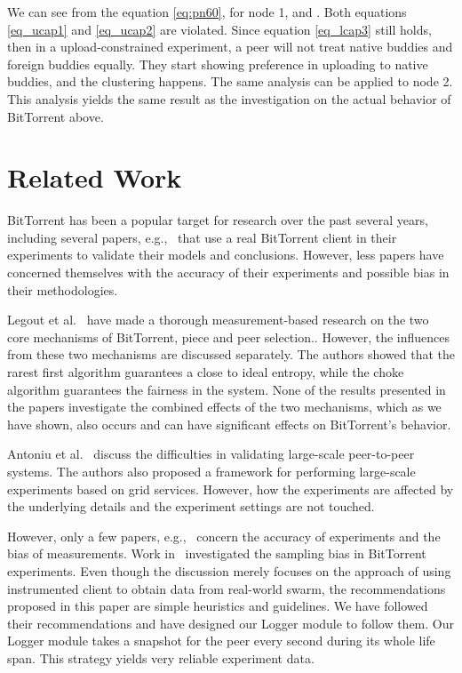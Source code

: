 \documentclass[10pt,letterpaper,twocolumn]{article}
\begin{document}
We can see from the equation \eqref{eq:pn60}, for node 1,
 and
. Both equations \eqref{eq_ucap1} and
\eqref{eq_ucap2} are violated. Since equation \eqref{eq_lcap3} still
holds, then in a upload-constrained experiment, a peer will not treat
native buddies and foreign buddies equally. They start showing
preference in uploading to native buddies, and the clustering
happens. The same analysis can be applied to node 2. This analysis
yields the same result as the investigation on the actual behavior of
BitTorrent above.













\section{Related Work}
\label{related_work}

BitTorrent has been a popular target for research over the past
several years, including several papers, e.g.,~\cite{meu09, ross06,
  sirvian07, legout07, legout05} that use a real BitTorrent client in
their experiments to validate their models and conclusions. However,
less papers have concerned themselves with the accuracy of their
experiments and possible bias in their methodologies.

Legout et al.~\cite{legout05, legout06} have made a thorough
measurement-based research on the two core mechanisms of BitTorrent,
piece and peer selection.. However, the influences from these two
mechanisms are discussed separately. The authors showed that the
rarest first algorithm guarantees a close to ideal entropy, while the
choke algorithm guarantees the fairness in the system. None of the
results presented in the papers investigate the combined effects of
the two mechanisms, which as we have shown, also occurs and can have
significant effects on BitTorrent's behavior.

Antoniu et al.~\cite{antoniu04} discuss the difficulties in validating
large-scale peer-to-peer systems. The authors also proposed a
framework for performing large-scale experiments based on grid
services. However, how the experiments are affected by the underlying
details and the experiment settings are not touched.

However, only a few papers, e.g.,~\cite{ras07,boxun10,rao10} concern
the accuracy of experiments and the bias of measurements. Work
in~\cite{boxun10} investigated the sampling bias in BitTorrent
experiments. Even though the discussion merely focuses on the approach
of using instrumented client to obtain data from real-world swarm, the
recommendations proposed in this paper are simple heuristics and
guidelines. We have followed their recommendations and have designed
our Logger module to follow them. Our Logger module takes a snapshot
for the peer every second during its whole life span. This strategy
yields very reliable experiment data.
\end{document}
